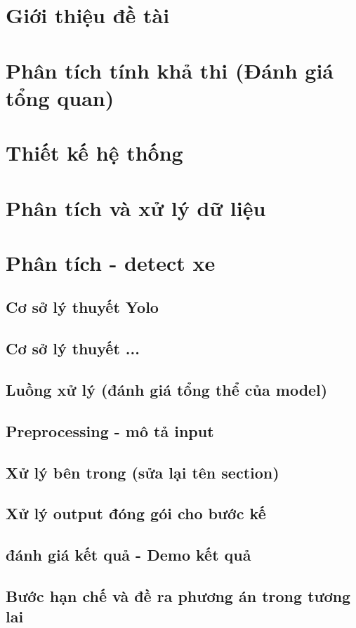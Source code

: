 \documentclass[a4paper]{article}
\theoremstyle{definition}
\begin{document}
\section{Giới thiệu đề tài}
\newpage
\section{Phân tích tính khả thi (Đánh giá tổng quan)}
\newpage
\section{Thiết kế hệ thống}
\newpage
\section{Phân tích và xử lý dữ liệu}
\newpage
\section{Phân tích - detect xe}
\subsection{Cơ sở lý thuyết Yolo}
\subsection{Cơ sở lý thuyết ...}
\subsection{Luồng xử lý (đánh giá tổng thể của model)}
\subsection{Preprocessing - mô tả input}
\subsection{Xử lý bên trong (sửa lại tên section)}
\subsection{Xử lý output đóng gói cho bước kế}
\subsection{đánh giá kết quả - Demo kết quả}
\subsection{Bước hạn chế và đề ra phương án trong tương lai}
\newpage
\end{document}
